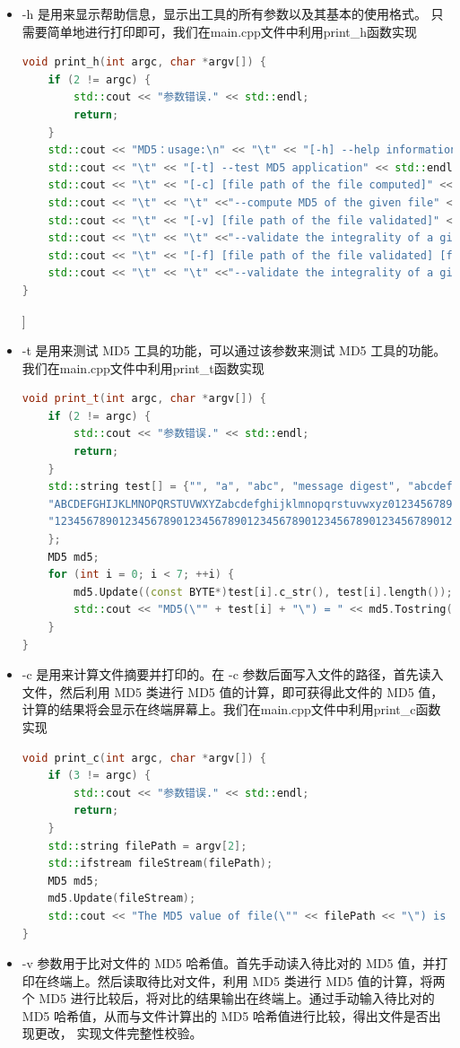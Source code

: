 \documentclass[UTF8,a4paper,10pt]{ctexart}
\begin{document}
\begin{itemize}
    \item -h 是用来显示帮助信息，显示出工具的所有参数以及其基本的使用格式。 只需要简单地进行打印即可，我们在main.cpp文件中利用print\_h函数实现
    \begin{lstlisting}[language = C++]
void print_h(int argc, char *argv[]) {
    if (2 != argc) {
        std::cout << "参数错误." << std::endl;
        return;
    }
    std::cout << "MD5：usage:\n" << "\t" << "[-h] --help information " << std::endl;
    std::cout << "\t" << "[-t] --test MD5 application" << std::endl;
    std::cout << "\t" << "[-c] [file path of the file computed]" << std::endl;
    std::cout << "\t" << "\t" <<"--compute MD5 of the given file" << std::endl;
    std::cout << "\t" << "[-v] [file path of the file validated]" << std::endl;
    std::cout << "\t" << "\t" <<"--validate the integrality of a given file by manual input MD5 value" << std::endl;
    std::cout << "\t" << "[-f] [file path of the file validated] [file path of the .md5 file]" << std::endl;
    std::cout << "\t" << "\t" <<"--validate the integrality of a given file by read MD5 value from .md5 file" << std::endl;
} 
    \end{lstlisting}]
    \item -t 是用来测试 MD5 工具的功能，可以通过该参数来测试 MD5 工具的功能。我们在main.cpp文件中利用print\_t函数实现
    \begin{lstlisting}[language = C++]
void print_t(int argc, char *argv[]) {
    if (2 != argc) {
        std::cout << "参数错误." << std::endl;
        return;
    }
    std::string test[] = {"", "a", "abc", "message digest", "abcdefghijklmnopqrstuvwxyz", 
    "ABCDEFGHIJKLMNOPQRSTUVWXYZabcdefghijklmnopqrstuvwxyz0123456789", 
    "12345678901234567890123456789012345678901234567890123456789012345678901234567890"
    };
    MD5 md5;
    for (int i = 0; i < 7; ++i) { 
        md5.Update((const BYTE*)test[i].c_str(), test[i].length());
        std::cout << "MD5(\"" + test[i] + "\") = " << md5.Tostring()<< std::endl;
    }
}
    \end{lstlisting}
    \item -c 是用来计算文件摘要并打印的。在 -c 参数后面写入文件的路径，首先读入文件，然后利用 MD5 类进行 MD5 值的计算，即可获得此文件的 MD5 值，计算的结果将会显示在终端屏幕上。我们在main.cpp文件中利用print\_c函数实现
    \begin{lstlisting}[language = C++]
void print_c(int argc, char *argv[]) {
    if (3 != argc) {
        std::cout << "参数错误." << std::endl;
        return;
    }
    std::string filePath = argv[2];
    std::ifstream fileStream(filePath);
    MD5 md5;
    md5.Update(fileStream);
    std::cout << "The MD5 value of file(\"" << filePath << "\") is " << md5.Tostring() << std::endl;
}
    \end{lstlisting}
    \item -v 参数用于比对文件的 MD5 哈希值。首先手动读入待比对的 MD5 值，并打印在终端上。然后读取待比对文件，利用 MD5 类进行 MD5 值的计算，将两个 MD5 进行比较后，将对比的结果输出在终端上。通过手动输入待比对的 MD5 哈希值，从而与文件计算出的 MD5 哈希值进行比较，得出文件是否出现更改， 实现文件完整性校验。
    

\end{itemize}
\end{document}

